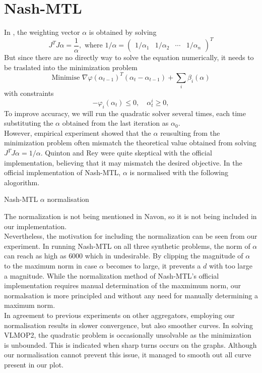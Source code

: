 \documentclass{article}
\newcommand{\R}{\mathbb{R}}
\newcommand{\mat}[1]{\begin{pmatrix}#1\end{pmatrix}}
\renewcommand{\|}{\biggr|}
\begin{document}
    \section{Nash-MTL}
    In , the weighting vector $\alpha$ is obtained by solving 
    \begin{equation*}
        J^TJ\alpha = \frac{1}{\alpha}, \text{ where } 1/\alpha = \mat{1/\alpha_1 & 1/\alpha_2 & \cdots & 1/\alpha_n}^T
    \end{equation*}
    But since there are no directly way to solve the equation numerically, it needs to be traslated into the minimization problem 
    \begin{equation*}
    \text{Minimise } \nabla \varphi(\alpha_{t-1})^T (\alpha_t - \alpha_{t-1}) + \sum_i \beta_i(\alpha)
    \end{equation*}
    with constraints 
    \begin{equation*}
        -\varphi_i(\alpha_t) \leq 0, \quad \alpha_t^i \geq 0,
    \end{equation*}
    To improve accuracy, we will run the quadratic solver several times, each time substituting the $\alpha$ obtained from the last iteration as $\alpha_0$.\\
    However, empirical experiment showed that the $\alpha$ reusulting from the minimization problem often mismatch the theoretical value obtained from solving $J^T J \alpha = 1/\alpha$. Quinton and Rey were quite skeptical with the official implementation, believing that it may mismatch the desired objective.
    In the official implementation of Nash-MTL, $\alpha$ is normalised with the following alogorithm.
    \begin{algorithm}[!ht]
        \caption{Nash-MTL $\alpha$ normalisation}
        \KwInput{$\alpha\in R^n, J\in R^{d\times n}, M\in \R_{>0}$}
        \KwOutput{$\alpha$}
    \end{algorithm}
    The normalization is not being mentioned in Navon, so it is not being included in our implementation.\\
    Nevertheless, the motivation for including the normalization can be seen from our experiment. In running Nash-MTL on all three synthetic problems, the norm of $\alpha$ can reach as high as $6000$ which in undesirable. By clipping the magnitude of $\alpha$ to the maximum norm in case $\alpha$ becomes to large, it prevents a $d$ with too large a magnitude. While the normalization method of Nash-MTL's official implementation requires manual determination of the maxmimum norm, our normalsation is more principled and without any need for manually determining a maximum norm.\\
    In agreement to previous experiments on other aggregators, employing our normalisation results in slower convergence, but also smoother curves. In solving VLMOP2, the quadratic problem is occasionally unsolvable as the minimization is unbounded. This is indicated when sharp turns occurs on the graphs. Although our normalisation cannot prevent this issue, it managed to smooth out all curve present in our plot. 
\end{document}
